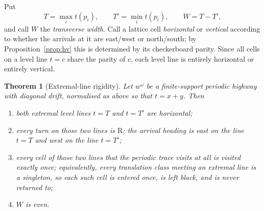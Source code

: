 \documentclass[11pt,reqno]{amsart}
\theoremstyle{plain}
\newtheorem{theorem}{Theorem}[section]
\theoremstyle{definition}
\newcommand{\turnR}{\mathrm{R}}
\begin{document}
Put
\[
T=\max_i t(p_i),\qquad T'=\min_i t(p_i),\qquad W=T-T',
\]
and call $W$ the \emph{transverse width}. Call a lattice cell \emph{horizontal} or
\emph{vertical} according to whether the arrivals at it are east/west or north/south;
by Proposition~\ref{prop:hv} this is determined by its checkerboard parity. Since all
cells on a level line $t=c$ share the parity of $c$, each level line is entirely
horizontal or entirely vertical.

\begin{theorem}[Extremal-line rigidity]\label{thm:extremal}
Let $w^\omega$ be a finite-support periodic highway with diagonal drift, normalised
as above so that $t=x+y$. Then
\begin{enumerate}[label=\textup{(\roman*)}]
\item both extremal level lines $t=T$ and $t=T'$ are horizontal;
\item every turn on those two lines is $\turnR$; the arrival heading is east on the
line $t=T$ and west on the line $t=T'$;
\item every cell of those two lines that the periodic trace visits at all is visited
\emph{exactly once}; equivalently, every translation class meeting an extremal line is
a singleton, so each such cell is entered once, is left black, and is never returned
to;
\item $W$ is even.
\end{enumerate}
\end{theorem}
\end{document}
